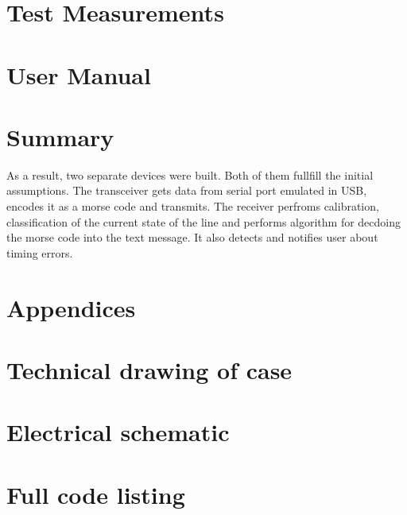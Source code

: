 \documentclass[12pt]{article}
\begin{document}
	\section{Test Measurements}
	
	\section{User Manual}
	
	\section{Summary}
  As a result, two separate devices were built. Both of them fullfill the initial assumptions.
  The transceiver gets data from serial port emulated in USB, encodes it as a morse code and transmits.
  The receiver perfroms calibration, classification of the current state of the line and performs algorithm for decdoing the morse code into the text message. It also detects and notifies user about timing errors.
	
	\begin{thebibliography}{9}
	\end{thebibliography}
	

  \section*{Appendices}
	\appendix
	\section{Technical drawing of case}
	\section{Electrical schematic}
	\section{Full code listing}
	
\end{document}
